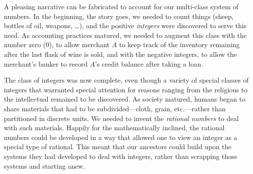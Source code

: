 \noindent
A pleasing narrative can be fabricated to account for our multi-class
system of numbers.  In the beginning, the story goes, we needed to
count things (sheep, bottles of oil, weapons, \ldots), and the
positive {\it integers} were discovered to serve
this need.  As accounting practices matured, we needed to augment this
class with the number zero  ($0$), to allow
merchant $A$ to keep track of the inventory remaining after the last
flask of wine is sold, and with the negative integers,
 to allow the merchant's banker to record $A$'s
credit balance after taking a loan.
%
{ }
{}  
%
The class of integers was now complete, even though a variety of
special classes of integers that warranted special attention for
reasons ranging from the religious to the intellectual remained to be
discovered.  As society matured, humans began to share materials that
had to be subdivided---cloth, grain, etc.---rather than partitioned in
discrete units.  We needed to invent the {\it rational numbers}
 to deal with such materials.  Happily for the
mathematically inclined, the rational numbers could be developed in a
way that allowed one to view an integer as a special type of rational.
This meant that our ancestors could build upon the systems they had
developed to deal with integers, rather than scrapping those systems
and starting anew.
\medskip

\noindent {}
\medskip

